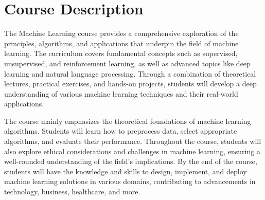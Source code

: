 \section{Course Description}

The Machine Learning course provides a comprehensive exploration of the principles, algorithms, and applications that underpin the field of machine learning. The curriculum covers fundamental concepts such as supervised, unsupervised, and reinforcement learning, as well as advanced topics like deep learning and natural language processing. Through a combination of theoretical lectures, practical exercises, and hands-on projects, students will develop a deep understanding of various machine learning techniques and their real-world applications.

The course mainly emphasizes the theoretical foundations of machine learning algorithms. Students will learn how to preprocess data, select appropriate algorithms, and evaluate their performance. Throughout the course, students will also explore ethical considerations and challenges in machine learning, ensuring a well-rounded understanding of the field's implications. By the end of the course, students will have the knowledge and skills to design, implement, and deploy machine learning solutions in various domains, contributing to advancements in technology, business, healthcare, and more.